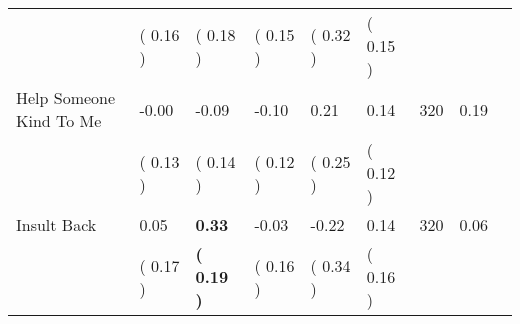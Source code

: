 \begin{tabular}{L{6.2cm} C{1.8cm} C{1.8cm} C{1.8cm} C{1.8cm} C{1.8cm} C{1.8cm} C{0.3cm} C{0.3cm}}
 & (     0.16 ) & (     0.18 ) & (     0.15 ) & (     0.32 ) & (     0.15 )  & \\
Help Someone Kind To Me &     -0.00 &     -0.09 &     -0.10 &      0.21 &      0.14  & 320 &       0.19 \\ 
 & (     0.13 ) & (     0.14 ) & (     0.12 ) & (     0.25 ) & (     0.12 )  & \\
Insult Back &      0.05 & \textbf{     0.33} &     -0.03 &     -0.22 &      0.14  & 320 &       0.06 \\ 
 & (     0.17 ) & \textbf{(     0.19 )} & (     0.16 ) & (     0.34 ) & (     0.16 )  & \\
\bottomrule
\end{tabular}
